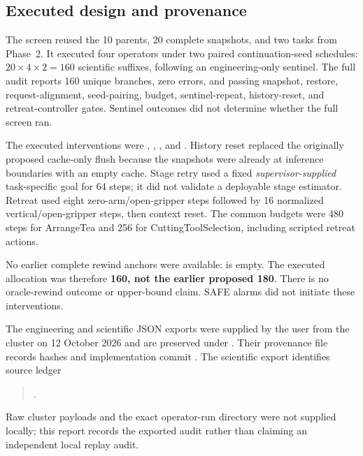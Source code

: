 \label{sec:operator-screen}

\subsection{Executed design and provenance}

The screen reused the 10 parents, 20 complete snapshots, and two tasks from Phase~2. It executed four operators under two paired continuation-seed schedules: $20\times4\times2=160$ scientific suffixes, following an engineering-only sentinel. The full audit reports 160 unique branches, zero errors, and passing snapshot, restore, request-alignment, seed-pairing, budget, sentinel-repeat, history-reset, and retreat-controller gates. Sentinel outcomes did not determine whether the full screen ran.

The executed interventions were , , , and . History reset replaced the originally proposed cache-only flush because the snapshots were already at inference boundaries with an empty cache. Stage retry used a fixed \emph{supervisor-supplied} task-specific goal for 64 steps; it did not validate a deployable stage estimator. Retreat used eight zero-arm/open-gripper steps followed by 16 normalized vertical/open-gripper steps, then context reset. The common budgets were 480 steps for ArrangeTea and 256 for CuttingToolSelection, including scripted retreat actions.

No earlier complete rewind anchors were available:  is empty. The executed allocation was therefore \textbf{160, not the earlier proposed 180}. There is no oracle-rewind outcome or upper-bound claim. SAFE alarms did not initiate these interventions.

The engineering and scientific JSON exports were supplied by the user from the cluster on 12 October 2026 and are preserved under . Their provenance file records hashes and implementation commit . The scientific export identifies source ledger
\begin{quote}\raggedright\small
{}.
\end{quote}
Raw cluster payloads and the exact operator-run directory were not supplied locally; this report records the exported audit rather than claiming an independent local replay audit.


